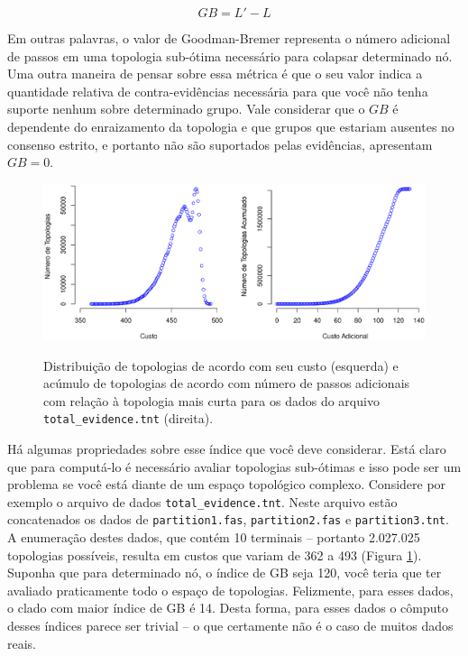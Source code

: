 \begin{refsection}
\begin{center}
\begin{equation}
GB=L'-L
\end{equation}
\end{center}

Em outras palavras, o valor de Goodman-Bremer representa o número adicional de passos em uma topologia sub-ótima necessário para colapsar determinado nó. Uma outra maneira de pensar sobre essa métrica é que o seu valor indica a quantidade relativa de contra-evidências necessária para que você não tenha suporte nenhum sobre determinado grupo. Vale considerar que o $GB$ é dependente do enraizamento da topologia e que grupos que estariam ausentes no consenso estrito, e portanto não são suportados pelas evidências, apresentam $GB=0$.\\

  \begin{figure}[h!]
      {\includegraphics[scale=0.65]{figures/tut14/plot_alltrees.eps}}
	{\caption[Distribuição e acúmulo durante enumeração.]{Distribuição de topologias de acordo com seu custo (esquerda) e acúmulo de topologias de acordo com número de passos adicionais com relação à topologia mais curta para os dados do arquivo \texttt{total\_evidence.tnt} (direita).}\label{tut14:fig:bremer1}}
  \end{figure}


Há algumas propriedades sobre esse índice que você deve considerar. Está claro que para computá-lo é necessário avaliar topologias sub-ótimas e isso pode ser um problema se você está diante de um espaço topológico complexo. Considere por exemplo o arquivo de dados \texttt{total\_evidence.tnt}. Neste arquivo estão concatenados os dados de \texttt{partition1.fas}, \texttt{partition2.fas} e \texttt{partition3.tnt}. A enumeração destes dados, que contém 10 terminais -- portanto 2.027.025 topologias possíveis, resulta em custos que variam de 362 a 493 (Figura \ref{tut14:fig:bremer1}). Suponha que para determinado nó, o índice de GB seja 120, você teria que ter avaliado praticamente todo o espaço de topologias. Felizmente, para esses dados, o clado com maior índice de GB é 14. Desta forma, para esses dados o cômputo desses índices parece ser trivial -- o que certamente não é o caso de muitos dados reais.


\end{refsection}
